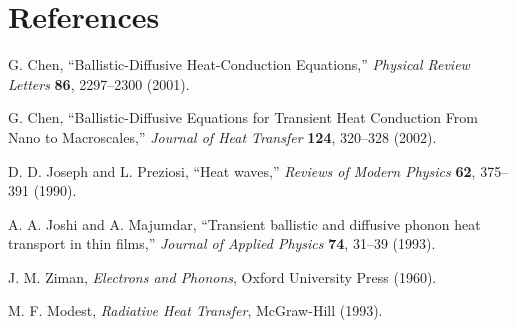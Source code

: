 \documentclass[11pt]{article}
\begin{document}
\section{References}
\begin{sloppypar}
\begin{enumerate}[label={[\arabic*]}]
\item G. Chen, ``Ballistic-Diffusive Heat-Conduction Equations,'' \emph{Physical Review Letters} \textbf{86}, 2297--2300 (2001).
\item G. Chen, ``Ballistic-Diffusive Equations for Transient Heat Conduction From Nano to Macroscales,'' \emph{Journal of Heat Transfer} \textbf{124}, 320--328 (2002).
\item D. D. Joseph and L. Preziosi, ``Heat waves,'' \emph{Reviews of Modern Physics} \textbf{62}, 375--391 (1990).
\item A. A. Joshi and A. Majumdar, ``Transient ballistic and diffusive phonon heat transport in thin films,'' \emph{Journal of Applied Physics} \textbf{74}, 31--39 (1993).
\item J. M. Ziman, \emph{Electrons and Phonons}, Oxford University Press (1960).
\item M. F. Modest, \emph{Radiative Heat Transfer}, McGraw-Hill (1993).
\end{enumerate}
\end{sloppypar}
\end{document}
